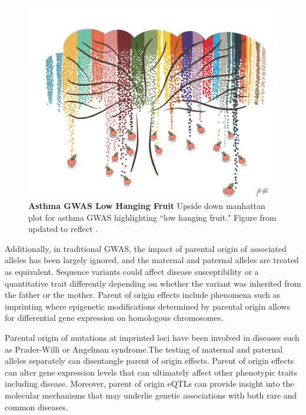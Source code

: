 \begin{figure}
\centering
\includegraphics[width=5in]{img/ch01/fig-01-lowhangingfruit.pdf}
\caption[Asthma GWAS Low Hanging Fruit.]{\textbf{Asthma GWAS Low Hanging Fruit} Upside down manhattan plot for asthma GWAS highlighting ``low hanging fruit." Figure from \cite{Ober:2016ga} updated to reflect \cite{Demenais:2018hy}.}
\label{fig:fig-01-lowhangingfruit}
\end{figure}

Additionally, in traditional GWAS, the impact of parental origin of associated alleles has been largely ignored, and the maternal and paternal alleles are treated as equivalent. Sequence variants could affect disease susceptibility or a quantitative trait differently depending on whether the variant was inherited from the father or the mother. Parent of origin effects include phenomena such as imprinting where epigenetic modifications determined by parental origin allows for differential gene expression on homologous chromosomes\cite{Lokody2014,Lawson2013}. 

Parental origin of mutations at imprinted loci have been involved in diseases such as Prader-Willi or Angelman syndrome\cite{Lawson2013,Peters2014}.The testing of maternal and paternal alleles separately can disentangle parent of origin effects. Parent of origin effects can alter gene expression levels that can ultimately affect other phenotypic traits including disease. Moreover, parent of origin eQTLs can provide insight into the molecular mechanisms that may underlie genetic associations with both rare and common diseases\cite{Lawson2013,Peters2014,Kong:2009kk,Stridh2014,Falls1999}.

